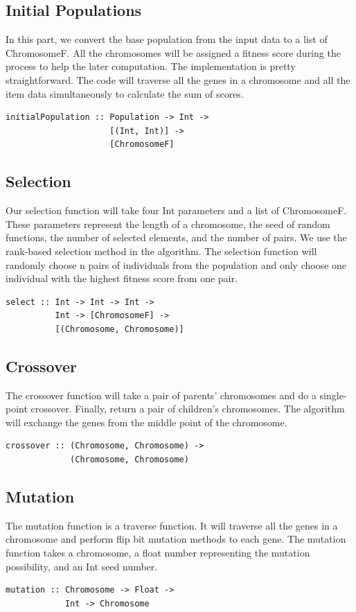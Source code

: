 \documentclass[sigconf]{acmart}
\begin{document}
\subsection{Initial Populations}
In this part, we convert the base population from the input data to a list of ChromosomeF. All the chromosomes will be assigned a fitness score during the process to help the later computation. The implementation is pretty straightforward. The code will traverse all the genes in a chromosome and all the item data simultaneously to calculate the sum of scores. 
\begin{lstlisting}
initialPopulation :: Population -> Int -> 
                     [(Int, Int)] -> 
                     [ChromosomeF]
\end{lstlisting}

\subsection{Selection}
Our selection function will take four Int parameters and a list of ChromosomeF. These parameters represent the length of a chromosome, the seed of random functions, the number of selected elements, and the number of pairs. We use the rank-based selection method in the algorithm. The selection function will randomly choose n pairs of individuals from the population and only choose one individual with the highest fitness score from one pair.
\begin{lstlisting}
select :: Int -> Int -> Int -> 
          Int -> [ChromosomeF] -> 
          [(Chromosome, Chromosome)]
\end{lstlisting}

\subsection{Crossover}
The crossover function will take a pair of parents' chromosomes and do a single-point crossover. Finally, return a pair of children's chromosomes. The algorithm will exchange the genes from the middle point of the chromosome. 
\begin{lstlisting}
crossover :: (Chromosome, Chromosome) -> 
             (Chromosome, Chromosome)
\end{lstlisting}
\subsection{Mutation}
The mutation function is a traverse function. It will traverse all the genes in a chromosome and perform flip bit mutation methods to each gene. The mutation function takes a chromosome, a float number representing the mutation possibility, and an Int seed number. 
\begin{lstlisting}
mutation :: Chromosome -> Float -> 
            Int -> Chromosome
\end{lstlisting}
\end{document}
